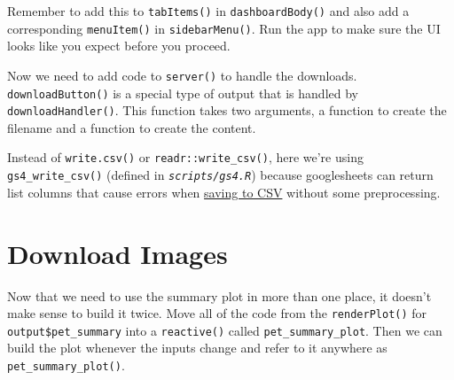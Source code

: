 \documentclass[
  oneside]{book}
\newenvironment{Shaded}{\begin{snugshade}}{\end{snugshade}}
\newcommand{\AttributeTok}[1]{\textcolor[rgb]{0.77,0.63,0.00}{#1}}
\newcommand{\ControlFlowTok}[1]{\textcolor[rgb]{0.13,0.29,0.53}{\textbf{#1}}}
\newcommand{\DocumentationTok}[1]{\textcolor[rgb]{0.56,0.35,0.01}{\textbf{\textit{#1}}}}
\newcommand{\FunctionTok}[1]{\textcolor[rgb]{0.00,0.00,0.00}{#1}}
\newcommand{\NormalTok}[1]{#1}
\newcommand{\OtherTok}[1]{\textcolor[rgb]{0.56,0.35,0.01}{#1}}
\newcommand{\SpecialCharTok}[1]{\textcolor[rgb]{0.00,0.00,0.00}{#1}}
\newcommand{\StringTok}[1]{\textcolor[rgb]{0.31,0.60,0.02}{#1}}
\begin{document}
\begin{warning}
Remember to add this to \texttt{tabItems}\texttt{()} in \texttt{dashboardBody}\texttt{()} and also add a corresponding \texttt{menuItem}\texttt{()} in \texttt{sidebarMenu}\texttt{()}. Run the app to make sure the UI looks like you expect before you proceed.

\end{warning}

Now we need to add code to \texttt{server}\texttt{()} to handle the downloads. \texttt{downloadButton}\texttt{()} is a special type of output that is handled by \texttt{downloadHandler}\texttt{()}. This function takes two arguments, a function to create the \AttributeTok{filename} and a function to create the \AttributeTok{content}.

\begin{Shaded}
\end{Shaded}

\begin{warning}
Instead of \texttt{write.csv}\texttt{()} or \texttt{readr::write\_csv}\texttt{()}, here we're using \texttt{gs4\_write\_csv}\texttt{()} (defined in \textit{\texttt{scripts/gs4.R}}) because googlesheets can return list columns that cause errors when \protect\hyperlink{gs4_save}{saving to CSV} without some preprocessing.

\end{warning}

\hypertarget{download-images}{%
\section{Download Images}\label{download-images}}

Now that we need to use the summary plot in more than one place, it doesn't make sense to build it twice. Move all of the code from the \texttt{renderPlot}\texttt{()} for \texttt{output\$pet\_summary} into a \texttt{reactive}\texttt{()} called \texttt{pet\_summary\_plot}. Then we can build the plot whenever the inputs change and refer to it anywhere as \texttt{pet\_summary\_plot}\texttt{()}.
\end{document}
